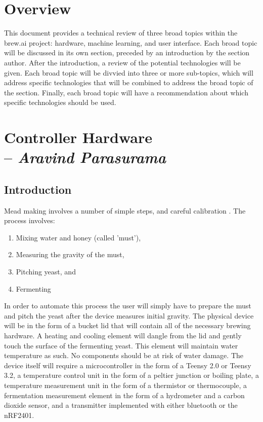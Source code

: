 
\section{Overview}
This document provides a technical review of three broad topics within the brew.ai project: hardware, machine learning, and user interface.
Each broad topic will be discussed in its own section, preceded by an introduction by the section author.
After the introduction, a review of the potential technologies will be given.
Each broad topic will be divvied into three or more sub-topics, which will address specific technologies that will be combined to address the broad topic of the section.
Finally, each broad topic will have a recommendation about which specific technologies should be used.

\section{Controller Hardware \\ -- \textbf{\textit{Aravind Parasurama}}}
\subsection{Introduction}
Mead making involves a number of simple steps, and careful calibration \cite{makingmead}. The process involves: 
\begin{enumerate}
	\item Mixing water and honey (called 'must'),
	\item Measuring the gravity of the must,
	\item Pitching yeast, and
	\item Fermenting
\end{enumerate}
In order to automate this process the user will simply have to prepare the must and pitch the yeast after the device measures initial gravity.
The physical device will be in the form of a bucket lid that will contain all of the necessary brewing hardware. A heating and cooling element will
	dangle from the lid and gently touch the surface of the fermenting yeast. This element will maintain water temperature as such. No components should be at
	risk of water damage.
The device itself will require a microcontroller in the form of a Teensy 2.0 or Teensy 3.2, a temperature control unit in the form of a peltier junction
	or boiling plate, a temperature measurement unit in the form of a thermistor or thermocouple, a fermentation measurement element in the form of a 
	hydrometer and a carbon dioxide sensor, and a transmitter implemented with either bluetooth or the nRF2401.

